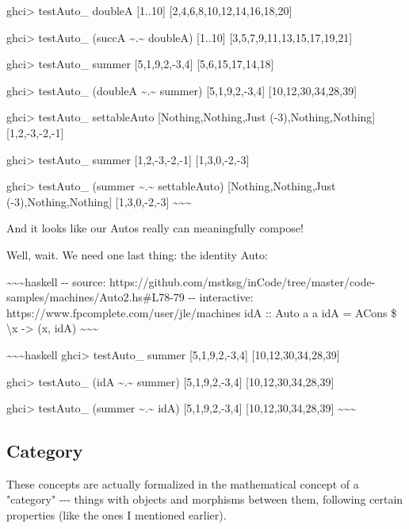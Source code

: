 \documentclass[]{article}
\begin{document}
ghci\textgreater{} testAuto\_ doubleA {[}1..10{]}
{[}2,4,6,8,10,12,14,16,18,20{]}

ghci\textgreater{} testAuto\_ (succA \textasciitilde{}.\textasciitilde{}
doubleA) {[}1..10{]} {[}3,5,7,9,11,13,15,17,19,21{]}

ghci\textgreater{} testAuto\_ summer {[}5,1,9,2,-3,4{]} {[}5,6,15,17,14,18{]}

ghci\textgreater{} testAuto\_ (doubleA \textasciitilde{}.\textasciitilde{}
summer) {[}5,1,9,2,-3,4{]} {[}10,12,30,34,28,39{]}

ghci\textgreater{} testAuto\_ settableAuto {[}Nothing,Nothing,Just
(-3),Nothing,Nothing{]} {[}1,2,-3,-2,-1{]}

ghci\textgreater{} testAuto\_ summer {[}1,2,-3,-2,-1{]} {[}1,3,0,-2,-3{]}

ghci\textgreater{} testAuto\_ (summer \textasciitilde{}.\textasciitilde{}
settableAuto) \textbar{} {[}Nothing,Nothing,Just (-3),Nothing,Nothing{]}
{[}1,3,0,-2,-3{]} \textasciitilde{}\textasciitilde{}\textasciitilde{}

And it looks like our Autos really can meaningfully compose!

Well, wait. We need one last thing: the identity Auto:

\textasciitilde{}\textasciitilde{}\textasciitilde{}haskell -\/- source:
https://github.com/mstksg/inCode/tree/master/code-samples/machines/Auto2.hs\#L78-79
-\/- interactive: https://www.fpcomplete.com/user/jle/machines idA :: Auto a a
idA = ACons \$ \textbackslash{}x -\textgreater{} (x, idA)
\textasciitilde{}\textasciitilde{}\textasciitilde{}

\textasciitilde{}\textasciitilde{}\textasciitilde{}haskell ghci\textgreater{}
testAuto\_ summer {[}5,1,9,2,-3,4{]} {[}10,12,30,34,28,39{]}

ghci\textgreater{} testAuto\_ (idA \textasciitilde{}.\textasciitilde{} summer)
{[}5,1,9,2,-3,4{]} {[}10,12,30,34,28,39{]}

ghci\textgreater{} testAuto\_ (summer \textasciitilde{}.\textasciitilde{} idA)
{[}5,1,9,2,-3,4{]} {[}10,12,30,34,28,39{]}
\textasciitilde{}\textasciitilde{}\textasciitilde{}

\subsection{Category}

These concepts are actually formalized in the mathematical concept of a
"category" -\/-\/- things with objects and morphisms between them, following
certain properties (like the ones I mentioned earlier).
\end{document}
